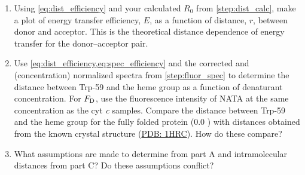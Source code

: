 \documentclass[nobib,nofonts,nols,nohyper]{tufte-handout}
\begin{document}
\begin{enumerate}
  \item Using \cref{eq:dist_efficiency} and your calculated \( R_0 \) from \cref{step:dist_calc}, make a plot of energy transfer efficiency, \( E \), as a function of distance, \( r \), between donor and acceptor. 
  This is the theoretical distance dependence of energy transfer for the donor--acceptor pair. 
  \item Use \cref{eq:dist_efficiency,eq:spec_efficiency} and the corrected and (concentration) normalized spectra from \cref{step:fluor_spec} to determine the distance between Trp-59 and the heme group as a function of denaturant concentration. 
  For \( F_{\textnormal{D}} \), use the fluorescence intensity of NATA at the same concentration as the cyt \emph{c} samples. 
  Compare the distance between Trp-59 and the heme group for the fully folded protein (\SI{0.0}{\Molar} ) with distances obtained from the known crystal structure (\href{https://www.rcsb.org/structure/1hrc}{PDB: 1HRC}). 
  How do these compare?
  \item What assumptions are made to determine \gibbs*[subscript-right=\ch{H2O}]{} from part A and intramolecular distances from part C\@? 
  Do these assumptions conflict?
\end{enumerate}



\nocite{*}
\printbibliography[category=cited]%

\printbibliography[%
	env=nolabelbib,%
  title={Further Reading},%
	resetnumbers,%
	notcategory=cited,%
	]
\end{document}
